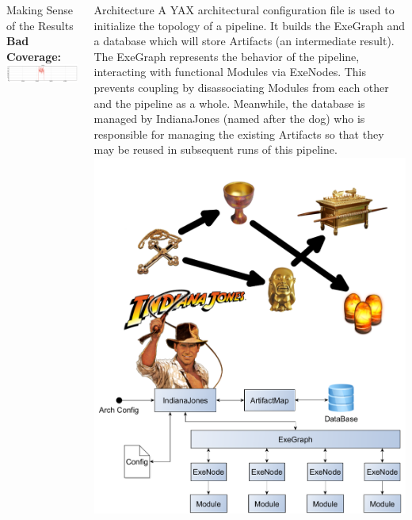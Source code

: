 \documentclass[final,t]{beamer}
\begin{document}
\begin{frame}{}
\begin{columns}[t]
\begin{column}{.3\linewidth}
\begin{block}{Making Sense of the Results}
        \textbf{Bad Coverage:}\\
        \includegraphics[width=.95\linewidth, center]{assets/coverage_plot_bad}
        \end{block}

    \end{column}


    \begin{column}{.3\linewidth}
        \begin{block}{Architecture}
            A YAX architectural configuration file is used to initialize the topology of a pipeline. It builds the
            ExeGraph and a database which will store Artifacts (an intermediate result).
            The ExeGraph represents the behavior of the pipeline, interacting with functional Modules via ExeNodes.
            This prevents coupling by disassociating Modules from each other and the pipeline as a whole. Meanwhile,
            the database is managed by IndianaJones (named after the dog) who is responsible for managing the existing
            Artifacts so that they may be reused in subsequent runs of this pipeline. \newline\newline
            \includegraphics[width=1\linewidth]{assets/arch}


\end{block}
\end{column}
\end{columns}
\end{frame}
\end{document}
